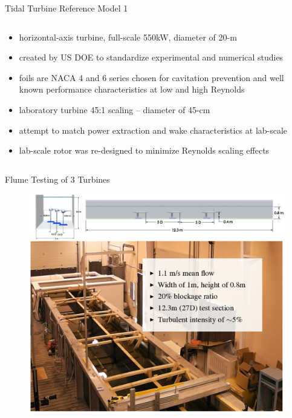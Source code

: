 \documentclass[xcolor=x11names,compress]{beamer}
\begin{document}
\begin{frame}{Tidal Turbine Reference Model 1}
\begin{columns}
\begin{column}{0.55\textwidth}
				\begin{itemize}
					\item \footnotesize horizontal-axis turbine, full-scale 550kW, diameter of 20-m
					\item created by US DOE to standardize experimental and numerical studies
					\item foils are NACA 4 and 6 series chosen for cavitation prevention and well known performance characteristics at low and high Reynolds
					\item laboratory turbine 45:1 scaling -- diameter of 45-cm
					\item attempt to match power extraction and wake characteristics at lab-scale
					\item lab-scale rotor was re-designed to minimize Reynolds scaling effects
				\end{itemize}
		    
		    \end{column}

		\end{columns}

	\end{frame}



	\begin{frame}{Flume Testing of 3 Turbines}

		\begin{figure}[p]
		    \centering
		    \includegraphics[width=1.0\textwidth]{figures/flume_and_description_v2.png}
		\end{figure}


	\end{frame}
\end{document}
